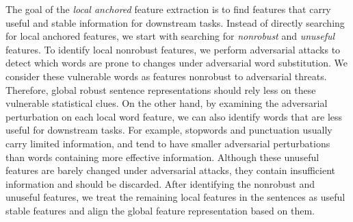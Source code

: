 \documentclass{article} \usepackage{iclr2021_conference,times}
\theoremstyle{definition}
\theoremstyle{remark}
\begin{document}
The goal of the \textit{local anchored} feature extraction is to find features that carry useful and stable information for downstream tasks. Instead of directly searching for local anchored features, we start with searching for \textit{nonrobust} and \textit{unuseful} features. To identify local nonrobust features, we perform adversarial attacks to detect which words are prone to changes under adversarial word substitution. We consider these vulnerable words as features nonrobust to adversarial threats. Therefore, global robust sentence representations should rely less on these vulnerable statistical clues. On the other hand, by examining the adversarial perturbation on each local word feature, we can also identify words that are less useful for downstream tasks. For example, stopwords and punctuation usually carry limited information, and tend to have smaller adversarial perturbations than words containing more effective information. Although these unuseful features are barely changed under adversarial attacks, they contain insufficient information and should be discarded. After identifying the nonrobust and unuseful features, we treat the remaining local features in the sentences as useful stable features and align the global feature representation based on them. 
\end{document}
